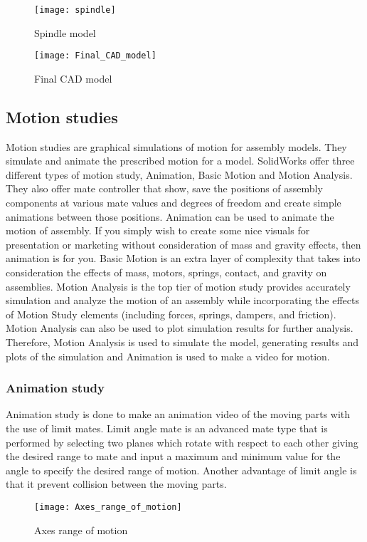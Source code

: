 \documentclass{book}
\begin{document}
\begin{figure}[h]
	
	\caption{Spindle model}
	\centering
	\texttt{[image: spindle]}
\end{figure}

\begin{figure}[h]
	
	\caption{Final CAD model}
	\centering
	\texttt{[image: Final\_CAD\_model]}
\end{figure}

\newpage
\subsection{Motion studies}
Motion studies are graphical simulations of motion for assembly models. They simulate and animate the prescribed motion for a model. SolidWorks offer three different types of motion study, Animation, Basic Motion and Motion Analysis. They also offer mate controller that show, save the positions of assembly components at various mate values and degrees of freedom and create simple animations between those positions.
\newline Animation can be used to animate the motion of assembly. If you simply wish to create some nice visuals for presentation or marketing without consideration of mass and gravity effects, then animation is for you. 
\newline Basic Motion is an extra layer of complexity that takes into consideration the effects of mass, motors, springs, contact, and gravity on assemblies. 
\newline Motion Analysis is the top tier of motion study provides accurately simulation and analyze the motion of an assembly while incorporating the effects of Motion Study elements (including forces, springs, dampers, and friction). Motion Analysis can also be used to plot simulation results for further analysis.
\newline Therefore, Motion Analysis is used to simulate the model, generating results and plots of the simulation and Animation is used to make a video for motion.
\subsubsection{Animation study} 
 Animation study is done to make an animation video of the moving parts with the use of limit mates. Limit angle mate is an advanced mate type that is performed by selecting two planes which rotate with respect to each other giving the desired range to mate and input a maximum and minimum value for the angle to specify the desired range of motion. Another advantage of limit angle is that it prevent collision between the moving parts.
\begin{figure}[h]
	
	\caption{Axes range of motion}
	\centering
	\texttt{[image: Axes\_range\_of\_motion]}
\end{figure}
\end{document}

